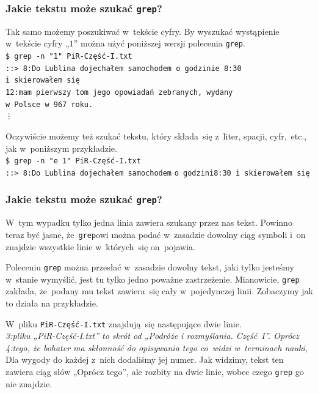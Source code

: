 \documentclass[10pt,t]{beamer}
\begin{document}
\begin{frame}
  \frametitle{Jakie tekstu może szukać \texttt{grep}?}


  Tak samo możemy poszukiwać w~tekście cyfry. By wyszukać wystąpienie
  w~tekście cyfry „$1$” można użyć poniższej wersji polecenia
  \texttt{grep}. \\
  \texttt{\$ grep -n "1"{} PiR-Część-I.txt} \\
  \texttt{::> 8:Do Lublina dojechałem samochodem o~godzinie
    8:30}
  \texttt{i~skierowałem~się} \\
  \texttt{12:mam pierwszy tom jego opowiadań zebranych, wydany} \\
  \texttt{w~Polsce w~967 roku.} \\
  \hspace{2em} \texttt{\vdots}

  Oczywiście możemy też szukać tekstu, który składa~się z~liter, spacji,
  cyfr,~etc., jak w~poniższym przykładzie. \\
  \texttt{\$ grep -n "e 1"{} PiR-Część-I.txt} \\
  \texttt{::> 8:Do Lublina dojechałem samochodem}
  \texttt{o~godzini8:30 i~skierowałem~się}

\end{frame}





\begin{frame}
  \frametitle{Jakie tekstu może szukać \texttt{grep}?}


  W~tym wypadku tylko jedna linia zawiera szukany przez nas tekst. Powinno
  teraz być jasne, że~\texttt{grep}owi można podać w~zasadzie dowolny ciąg
  symboli i~on znajdzie wszystkie linie w~których~się on~pojawia.

  Poleceniu \texttt{grep} można przesłać w~zasadzie dowolny tekst,
  jaki tylko jesteśmy w~stanie wymyślić, jest tu tylko jedno poważne
  zastrzeżenie. Mianowicie, \texttt{grep} zakłada, że~podany mu tekst
  zawiera~się cały w~\alert{pojedynczej linii}. Zobaczymy jak to działa na
  przykładzie.

  W~pliku \texttt{PiR-Część-I.txt} znajdują~się następujące dwie linie. \\
  \textit{3:pliku „PiR-Część-I.txt” to skrót od „Podróże i rozmyślania.
    Część~I”. Oprócz} \\
  \textit{4:tego, że bohater ma skłonność do opisywania tego
    co~widzi w~terminach nauki,} \\
  Dla wygody do każdej z~nich dodaliśmy jej numer. Jak widzimy, tekst ten
  zawiera ciąg słów „Oprócz tego”, ale rozbity na dwie linie, wobec
  czego \texttt{grep} go nie znajdzie.

\end{frame}
\end{document}
